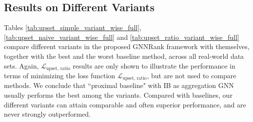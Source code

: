 \documentclass[nohyperref]{article}
\theoremstyle{plain}
\theoremstyle{definition}
\theoremstyle{remark}
\begin{document}
\subsection{Results on Different Variants}
\label{appendix_subsec:variant_wise_results_full}
Tables \ref{tab:upset_simple_variant_wise_full}, \ref{tab:upset_naive_variant_wise_full} and \ref{tab:upset_ratio_variant_wise_full} compare different variants in the proposed GNNRank framework with themselves, together with the best and the worst baseline method, across all real-world data sets. Again, $\mathcal{L}_\text{upset, ratio}$ results are only  shown to illustrate the performance
in terms of minimizing the loss function $\mathcal{L}_\text{upset, ratio}$, but are not used to compare
methods. We conclude that ``proximal baseline" with IB as aggregation GNN usually performs the best among the variants. Compared with baselines, our different variants can attain comparable and often superior performance, and are never strongly outperformed. 
\end{document}
